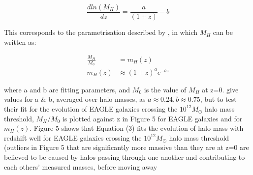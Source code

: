 \documentclass[12pt]{article}%
\begin{document}
\begin{equation}
    \frac{dln(M_H)}{dz}=\frac{a}{(1+z)}-b
\end{equation}

\noindent This corresponds to the parametrisation described by \cite{Correa}, in which $M_H$ can be written as:

\begin{align}
    \frac{M_H}{M_0}&=m_H(z) \nonumber \\
    m_H(z)&\approx(1+z)^ae^{-bz}
\end{align}

\noindent where a and b are fitting parameters, and $M_0$ is the value of $M_H$ at z=0. \cite{Correa} give values for a \& b, averaged over halo masses, as $\bar a \approx 0.24, \bar b \approx 0.75$, but to test their fit for the evolution of EAGLE galaxies crossing the $10^{12}M_\odot$ halo mass threshold, $M_H/M_0$ is plotted against z in Figure 5 for EAGLE galaxies and for $m_H(z)$. Figure 5 shows that Equation (3) fits the evolution of halo mass with redshift well for EAGLE galaxies crossing the $10^{12}M_\odot$ halo mass threshold (outliers in Figure 5 that are significantly more massive than they are at z=0 are believed to be caused by halos passing through one another and contributing to each others' measured masses, before moving away

\onecolumngrid
\end{document}
